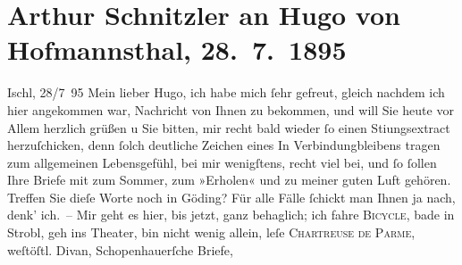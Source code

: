 

         
         \renewcommand{\erwaehntePersonen}{Personen: Julius Frauenstädt, Paul Goldmann, Hugo von Hofmannsthal, Ernst Otto Lindner, Ludwig Schemann, Arthur Schopenhauer}
         \renewcommand{\erwaehnteOrte}{Orte: Bad Ischl, Hodonín, Kopenhagen, Strobl, Wien}
         \renewcommand{\erwaehnteWerke}{Werke: Arthur Schopenhauer. Von ihm. Über ihn, Die Frau des Weisen. Erzählung, Die Kartause von Parma, Freiwild. Schauspiel in 3 Akten, Schopenhauer-Briefe, West-östlicher Divan}
               \section[Arthur Schnitzler an Hugo von Hofmannsthal, 28. 7. 1895]{ Arthur Schnitzler an Hugo von Hofmannsthal, 28. 7. 1895}\nopagebreak{}\rehead{ }\begin{ledgroupsized}[t]{13cm}\normalsize\beginnumbering \toendnotes[C]{\smallbreak\pagebreak[2]} 
\toendnotes[C]{\smallbreak}\pstart
           \raggedleft{}{\pb}Ischl, 28/7 95\pend
           \pstart
           Mein lieber Hugo, ich habe mich ſehr gefreut, gleich nachdem ich
               hier angekommen war, Nachricht von Ihnen zu bekommen, und will Sie heute vor Allem
               herzlich grüßen u Sie bitten, mir recht bald wieder ſo einen Sti{\geminationm}ungsextract herzuſchicken, denn ſolch deutliche Zeichen
               eines In Verbindungbleibens tragen zum allgemeinen Lebensgefühl, bei mir wenigſtens,
               recht viel bei, und ſo ſollen {\pb}Ihre Briefe mit zum
               Sommer, zum »Erholen« und zu meiner guten Luft gehören. Treffen Sie dieſe Worte noch
               in Göding? Für alle Fälle ſchickt man Ihnen ja
               nach, denk’ ich. – Mir geht es hier, bis jetzt, ganz behaglich; ich fahre \textsc{Bicycle}, bade in Strobl,
               geh ins Theater, bin nicht wenig allein, leſe \textsc{Chartreuse de Parme}, weſtöſtl. Divan, Schopenhauerſche Briefe,

\end{ledgroupsized}
